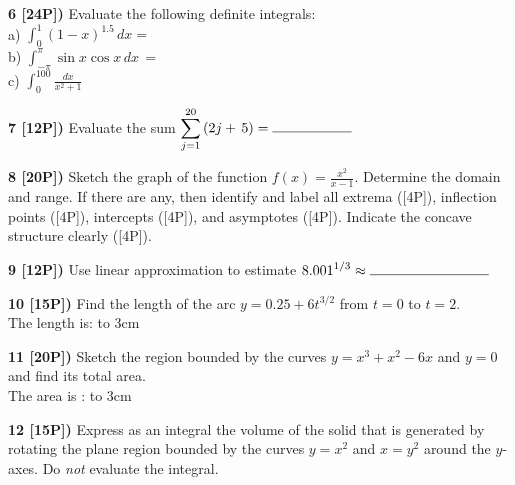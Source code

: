 \documentclass[12pt]{article}
\begin{document}
{\bf 6 [24P])} Evaluate the following definite integrals:
\\ %

a)  $\displaystyle{\int_{0}^1 (1 - x)^{1.5}\, dx =}$
\\

b) ${ \int_{-\pi}^{\pi} \sin x \cos x\, dx\, = }$
\\

c) 
$\displaystyle{\int^{100}_0 \frac{dx}{x^2+1} \, }$
\\ 

\vspace{3.5in}

{\bf 7 [12P])} Evaluate the sum $ 
\displaystyle{\sum_{j=1}^{20}\left( 2j  +\, 5\right) =
\hbox  to 2cm{\hrulefill}}$

\vspace{4.25in}

{\bf 8 [20P])} Sketch the graph of the function
${\displaystyle f(x) = \frac{x^2}{x-1}}$. Determine the domain and
range. If there are any, then identify and label all
extrema ([4P]), inflection points ([4P]), intercepts
([4P]), and asymptotes ([4P]). Indicate the concave structure
clearly ([4P]).

\vspace{4.25in}


{\bf 9 [12P])}
Use linear approximation to estimate
$\displaystyle{8.001^{1/3}\approx\hbox  to 3cm{\hrulefill} }$

\vspace{3.25in}


{\bf 10 [15P])} Find the length of the arc
$\displaystyle{y = 0.25 + 6t^{3/2}}$
from $\displaystyle{t=0}$ to $\displaystyle{t = 2}$.
\\

The length is: \hbox  to 3cm{\hrulefill}

\vspace{3.25in}




{\bf 11 [20P])} Sketch the region bounded by the curves
$\displaystyle{y=x^3+x^2-6x}$ and ${\displaystyle y = 0}$ and find its 
total area.
\\

The area is : \hbox  to 3cm{\hrulefill}


\vspace{3.25in}

{\bf 12 [15P])} Express as an  integral the volume of the solid that is generated
by rotating the plane region bounded
by the curves  $\displaystyle{y= x^2}$ and
${\displaystyle x =  y^2}$  around the $y$-axes.
Do {\em not} evaluate the integral. 
\\


\vspace{3.25in}

\end{document}
